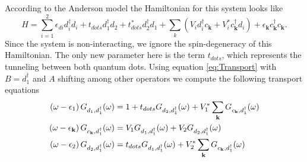 According to the Anderson model the Hamiltonian for this system looks like 
\begin{equation}
    H=\sum_{i=1}^2\epsilon_{di}d_{i}^{\dagger}d_{i}+ t_{dots}d_{1}^{\dagger}d_{2}+t_{dots}^*d_{2}^{\dagger}d_{1}+\sum_{k}\left(V_{i}d_{i}^{\dagger}c_{\mathbf{k}}+V_{i}^{*}c_{\mathbf{k}}^{\dagger}d_{i}\right) + \epsilon_{\mathbf{k}}c_{\mathbf{k}}^{\dagger}c_{\mathbf{k}}.
    \label{eq:HDQD}
\end{equation} 
\noindent Since the system is non-interacting, we ignore the spin-degeneracy of this Hamiltonian. The only new parameter here is the term $t_{dots}$, which represents the tunneling between both quantum dots.  Using equation \eqref{eq:Transport} with $B = d_1^\dagger$ and $A$ shifting among other operators we compute the following  transport equations
\begin{align}
     \left(\omega-\epsilon_{1}\right)G_{d_{1},d_{1}^{\dagger}}(\omega)&=1+t_{dots}G_{d_{2},d_{1}^{\dagger}}(\omega)+V_{1}^{*}\sum_{\mathbf{k}}G_{c_{\mathbf{k}},d_{1}^{\dagger}}(\omega) \label{eq:green1}  \\
     \left(\omega-\epsilon_{\mathbf{k}}\right)G_{c_{\mathbf{k}},d_{1}^{\dagger}}(\omega) &= V_{1}G_{d_{1},d_{1}^{\dagger}}(\omega)+V_{2}G_{d_{2},d_{1}^{\dagger}}(\omega) \label{eq:green2} \\
     \left(\omega-\epsilon_{2}\right)G_{d_{2},d_{1}^{\dagger}}(\omega)&= t_{dots}G_{d_{1},d_{1}^{\dagger}}(\omega)+V_{2}^{*}\sum_{\mathbf{k}}G_{c_{\mathbf{k}},d_{1}^{\dagger}}(\omega) \label{eq:green3} 
\end{align}


